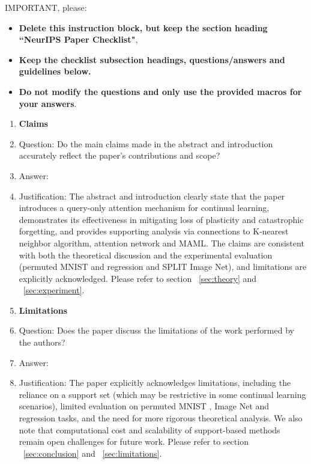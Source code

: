 IMPORTANT, please:
\begin{itemize}
    \item {\bf Delete this instruction block, but keep the section heading ``NeurIPS Paper Checklist"},
    \item  {\bf Keep the checklist subsection headings, questions/answers and guidelines below.}
    \item {\bf Do not modify the questions and only use the provided macros for your answers}.
\end{itemize} 
 



\begin{enumerate}

\item {\bf Claims}
    \item[] Question: Do the main claims made in the abstract and introduction accurately reflect the paper's contributions and scope?
    \item[] Answer: \answerYes{} %
    \item[] Justification: The abstract and introduction clearly state that the paper introduces a query-only attention mechanism for continual learning, demonstrates its effectiveness in mitigating loss of plasticity and catastrophic forgetting, and provides supporting analysis via connections to K-nearest neighbor algorithm, attention network and MAML. The claims are consistent with both the theoretical discussion and the experimental evaluation (permuted MNIST and regression and SPLIT Image Net), and limitations are explicitly acknowledged. Please refer to section ~\ref{sec:theory} and ~\ref{sec:experiment}.
    

\item {\bf Limitations}
    \item[] Question: Does the paper discuss the limitations of the work performed by the authors?
    \item[] Answer:   \answerYes{} %
    \item[] Justification: The paper explicitly acknowledges limitations, including the reliance on a support set (which may be restrictive in some continual learning scenarios), limited evaluation on permuted MNIST , Image Net and regression tasks, and the need for more rigorous theoretical analysis. We also note that computational cost and scalability of support-based methods remain open challenges for future work. Please refer to section ~\ref{sec:conclusion} and ~\ref{sec:limitations}.


\end{enumerate}
